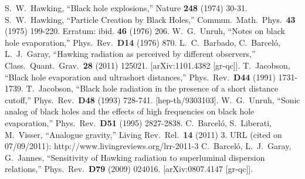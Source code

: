 \documentclass[11pt,a4paper]{article}
\begin{document}
\newpage
\begin{thebibliography}{666}

%
  S.~W.~Hawking,
  ``Black hole explosions,''
  Nature {\bf 248 } (1974)  30-31.
%
  S.~W.~Hawking,
  ``Particle Creation by Black Holes,''
  Commun.\ Math.\ Phys.\  {\bf 43 } (1975)  199-220. 
Erratum: {ibid.\/}  {\bf 46 } (1976) 206. %
  W.~G.~Unruh,
  ``Notes on black hole evaporation,''
  Phys.\ Rev.\  {\bf D14 } (1976)  870.
  L.~C.~Barbado, C.~Barcel\'o, L.~J.~Garay,
  ``Hawking radiation as perceived by different observers,''
  Class.\ Quant.\ Grav.\  {\bf 28 } (2011)  125021.
  [arXiv:1101.4382 [gr-qc]].
  T.~Jacobson,
  ``Black hole evaporation and ultrashort distances,''
  Phys.\ Rev.\  {\bf D44 } (1991)  1731-1739.
  T.~Jacobson,
  ``Black hole radiation in the presence of a short distance cutoff,''
  Phys.\ Rev.\  {\bf D48 } (1993)  728-741.
  [hep-th/9303103].
  W.~G.~Unruh,
  ``Sonic analog of black holes and the effects of high frequencies on black hole evaporation,''
  Phys.\ Rev.\  {\bf D51 } (1995)  2827-2838.
  C.~Barcel\'o, S.~Liberati, M.~Visser,
  ``Analogue gravity,''
  Living Rev.\ Rel.\  {\bf 14 } (2011)  3.
URL (cited on 07/09/2011):
http://www.livingreviews.org/lrr-2011-3
  C.~Barcel\'o, L.~J.~Garay, G.~Jannes,
  ``Sensitivity of Hawking radiation to superluminal dispersion relations,''
  Phys.\ Rev.\  {\bf D79 } (2009)  024016.
  [arXiv:0807.4147 [gr-qc]].

\end{thebibliography}
\end{document}
